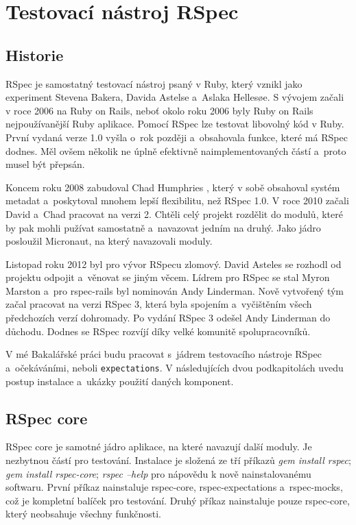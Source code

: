 \section {Testovací nástroj RSpec}
\subsection{Historie}
\par RSpec\cite{davidchelimsky2015} je samostatný testovací nástroj psaný v Ruby, který vznikl jako experiment Stevena Bakera, Davida Astelse a~Aslaka Hellesøe. S vývojem začali v roce 2006 na Ruby on Rails, neboť okolo roku 2006 byly Ruby on Rails nejpoužívanější Ruby aplikace. Pomocí RSpec lze testovat libovolný kód v Ruby. První vydaná verze 1.0 vyšla o~rok později a~obsahovala funkce, které má RSpec dodnes. Měl ovšem několik ne úplně efektivně naimplementovaných částí a~proto musel být přepsán.
\par Koncem roku 2008 zabudoval Chad Humphries , který v sobě obsahoval systém metadat a~poskytoval mnohem lepší flexibilitu, než RSpec 1.0. V roce 2010 začali David a~Chad pracovat na verzi 2. Chtěli celý projekt rozdělit do modulů, které by pak mohli pužívat samostatně a~navazovat jedním na druhý. Jako jádro posloužil Micronaut, na který navazovali moduly.
\par Listopad roku 2012 byl pro vývor RSpecu zlomový. David Asteles se rozhodl od projektu odpojit a~věnovat se jiným věcem. Lídrem pro RSpec se stal Myron Marston a~pro rspec-rails byl nominován Andy Linderman. Nově vytvořený tým začal pracovat na verzi RSpec 3, která byla spojením a~vyčištěním všech předchozích verzí dohromady. Po vydání RSpec 3 odešel Andy Linderman do důchodu. Dodnes se RSpec rozvíjí díky velké komunitě spolupracovníků.
\par V mé Bakalářské práci budu pracovat s~jádrem testovacího nástroje RSpec a~očekáváními, neboli \texttt{expectations}. V následujících dvou podkapitolách uvedu postup instalace a~ukázky použití daných komponent.

\subsection{RSpec core}
\par RSpec core je samotné jádro aplikace, na které navazují další moduly. Je nezbytnou částí pro testování. Instalace je složená ze tří příkazů \textit{gem install rspec}; \textit{gem install rspec-core}; \textit{rspec --help} pro nápovědu k nově nainstalovanému softwaru. První příkaz nainstaluje rspec-core, rspec-expectations a~rspec-mocks, což je kompletní balíček pro testování. Druhý příkaz nainstaluje pouze rspec-core, který neobsahuje všechny funkčnosti. 


